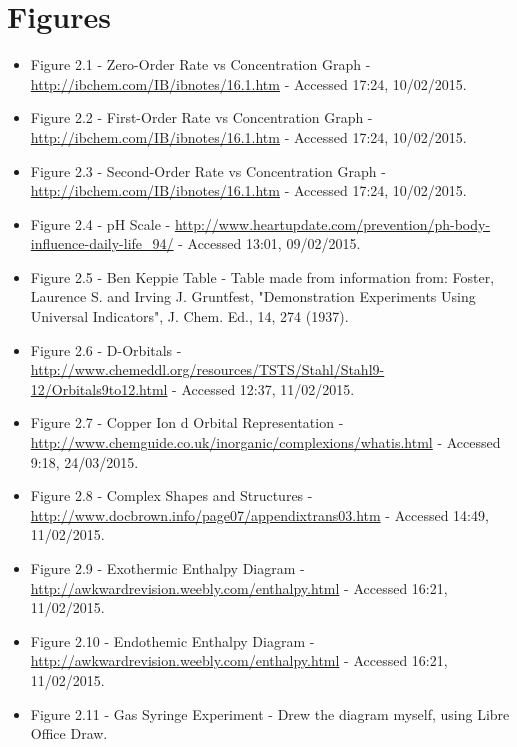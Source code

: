 \section{Figures}
\begin{itemize}

\item Figure 2.1 - Zero-Order Rate vs Concentration Graph - \url{http://ibchem.com/IB/ibnotes/16.1.htm} - Accessed 17:24, 10/02/2015.

\item Figure 2.2 - First-Order Rate vs Concentration Graph  - \url{http://ibchem.com/IB/ibnotes/16.1.htm} - Accessed 17:24, 10/02/2015.

\item Figure 2.3 - Second-Order Rate vs Concentration Graph  - \url{http://ibchem.com/IB/ibnotes/16.1.htm} - Accessed 17:24, 10/02/2015.

\item Figure 2.4 - pH Scale - \url{http://www.heartupdate.com/prevention/ph-body-influence-daily-life_94/} - Accessed 13:01, 09/02/2015. 

\item Figure 2.5 - Ben Keppie Table - Table made from information from: Foster, Laurence S. and Irving J. Gruntfest, "Demonstration Experiments Using Universal Indicators", J. Chem. Ed., 14, 274 (1937).

\item Figure 2.6 - D-Orbitals - \url{http://www.chemeddl.org/resources/TSTS/Stahl/Stahl9-12/Orbitals9to12.html} - Accessed 12:37, 11/02/2015.

\item Figure 2.7 - Copper Ion d Orbital Representation - \url{http://www.chemguide.co.uk/inorganic/complexions/whatis.html} - Accessed 9:18, 24/03/2015.

\item Figure 2.8 - Complex Shapes and Structures - \url{http://www.docbrown.info/page07/appendixtrans03.htm} - Accessed 14:49, 11/02/2015.


\item Figure 2.9 - Exothermic Enthalpy Diagram - \url{http://awkwardrevision.weebly.com/enthalpy.html} - Accessed 16:21, 11/02/2015.

\item Figure 2.10 - Endothemic Enthalpy Diagram - \url{http://awkwardrevision.weebly.com/enthalpy.html} - Accessed 16:21, 11/02/2015.

\item Figure 2.11 - Gas Syringe Experiment - Drew the diagram myself, using Libre Office Draw.


\end{itemize}
